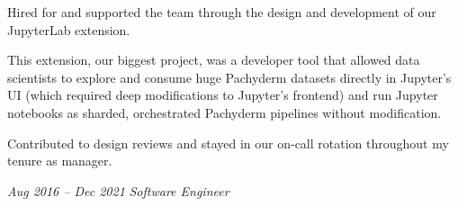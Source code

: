 \documentclass[10pt, letterpaper]{article}
\begin{document}
\begin{comment}
\begin{onecolentry}
  \small
  \textbf{Pachyderm is a distributed filesystem with versioning, designed to eliminate duplicate work in e.g. ETL and ML preprocessing pipelines and, eventually, AI training. We were ``Git for data'' or ``Bazel for data''.}
\end{onecolentry}

\vspace{0.1 cm}

\begin{twocolentry}{
    \textit{Jan 2022 – Feb 2023}
}
    \textit{Software Engineering Manager}
\end{twocolentry}

\vspace{0.1 cm}

\end{comment}

\begin{onecolentry}
    \begin{highlights}
        \item Hired for and supported the team through the design and development of our JupyterLab extension.
        \item This extension, our biggest project, was a developer tool that allowed data scientists to explore and consume huge Pachyderm datasets directly in Jupyter's UI (which required deep modifications to Jupyter's frontend) and run Jupyter notebooks as sharded, orchestrated Pachyderm pipelines without modification.
        \item Contributed to design reviews and stayed in our on-call rotation throughout my tenure as manager.
    \end{highlights}
\end{onecolentry}

\vspace{0.2 cm}

\begin{twocolentry}{
    \textit{Aug 2016 – Dec 2021}
}
    \textit{Software Engineer}
\end{twocolentry}
\end{document}
